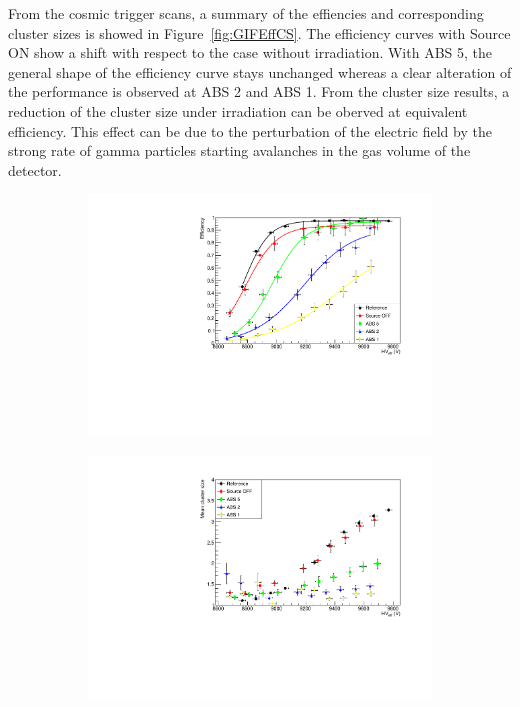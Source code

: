 	From the cosmic trigger scans, a summary of the effiencies and corresponding cluster sizes is showed in Figure~\ref{fig:GIFEffCS}. The efficiency curves with Source ON show a shift with respect to the case without irradiation. With ABS 5, the general shape of the efficiency curve stays unchanged whereas a clear alteration of the performance is observed at ABS 2 and ABS 1. From the cluster size results, a reduction of the cluster size under irradiation can be oberved at equivalent efficiency. This effect can be due to the perturbation of the electric field by the strong rate of gamma particles starting avalanches in the gas volume of the detector.
	
	\begin{figure}[H]
    	\begin{subfigure}{0.5\linewidth}
			\centering
			\includegraphics[width = 0.7\plotwidth]{fig/chapt5/Efficiency.pdf}
        	\caption{\label{fig:GIFEffCS:A}}
    	\end{subfigure}
    	\begin{subfigure}{0.5\linewidth}
			\centering
			\includegraphics[width = 0.7\plotwidth]{fig/chapt5/Cluster-Size.pdf}

\end{subfigure}
\end{figure}
